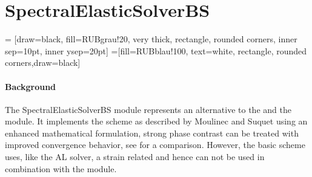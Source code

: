 \section{SpectralElasticSolverBS}
\label{sec:module_spectralelasticsolverBS}

 = [draw=black, fill=RUBgrau!20, very thick, rectangle, rounded corners, inner sep=10pt, inner ysep=20pt]
 =[fill=RUBblau!100, text=white, rectangle, rounded corners,draw=black]

\paragraph{Background} The SpectralElasticSolverBS module represents an alternative to the  and the  module. It implements the scheme as described by Moulinec and Suquet  using an enhanced mathematical formulation, strong phase contrast can be treated with improved convergence behavior, see  for a comparison. However, the basic scheme uses, like the AL solver, a strain related and hence can not be used in combination with the  module.\\


